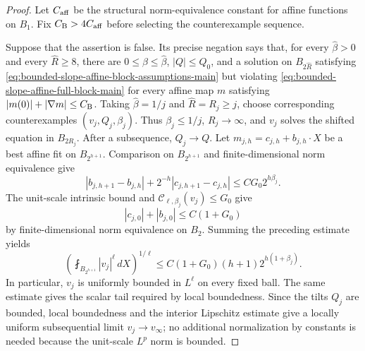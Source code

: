 \documentclass[11pt,reqno]{amsart}
\numberwithin{equation}{section}
\newcommand{\dd}{\,d}
\theoremstyle{remark}
\begin{document}
\begin{proof}
Let \(C_{\rm aff}\) be the structural norm-equivalence constant for
affine functions on \(B_1\).  Fix \(C_{\rm B}>4C_{\rm aff}\) before
selecting the counterexample sequence.

Suppose that the assertion is false.  Its precise negation says that,
for every \(\widehat\beta>0\) and every \(\widehat R\ge8\), there are
\(0\le\beta\le\widehat\beta\), \(|Q|\le Q_0\), and a solution on
\(B_{2\widehat R}\) satisfying
\eqref{eq:bounded-slope-affine-block-assumptions-main} but violating
\eqref{eq:bounded-slope-affine-full-block-main} for every affine map
\(m\) satisfying \(|m(0)|+|\nabla m|\le C_{\rm B}\).  Taking
\(\widehat\beta=1/j\) and
\(\widehat R=R_j\ge j\), choose corresponding counterexamples
\((v_j,Q_j,\beta_j)\).  Thus \(\beta_j\le1/j\), \(R_j\to\infty\),
and \(v_j\) solves the shifted equation in \(B_{2R_j}\).
After a subsequence, \(Q_j\to Q\).  Let
\(m_{j,h}=c_{j,h}+b_{j,h}\cdot X\) be a best affine fit on
\(B_{2^{h+1}}\).  Comparison on \(B_{2^{h+1}}\) and
finite-dimensional norm equivalence give
\begin{equation*}
 |b_{j,h+1}-b_{j,h}|+2^{-h}|c_{j,h+1}-c_{j,h}|
 \le C G_0 2^{h\beta_j}.
\end{equation*}
The unit-scale intrinsic bound and
\(\mathscr C_{\ell,\beta_j}(v_j)\le G_0\) give
\[
 |c_{j,0}|+|b_{j,0}|\le C(1+G_0)
\]
by finite-dimensional norm equivalence on \(B_2\).
Summing the preceding estimate yields
\begin{equation*}
 \left(\fint_{B_{2^{h+1}}}|v_j|^\ell\dd X\right)^{1/\ell}
 \le C(1+G_0)(h+1)2^{h(1+\beta_j)}.
\end{equation*}
In particular, \(v_j\) is uniformly bounded in \(L^\ell\) on every
fixed ball.  The same estimate gives the scalar tail required by local
boundedness.  Since the tilts \(Q_j\) are bounded, local boundedness and
the interior Lipschitz estimate give a locally uniform subsequential
limit \(v_j\to v_\infty\); no additional normalization by constants is
needed because the unit-scale \(L^p\) norm is bounded.


\end{proof}
\end{document}
